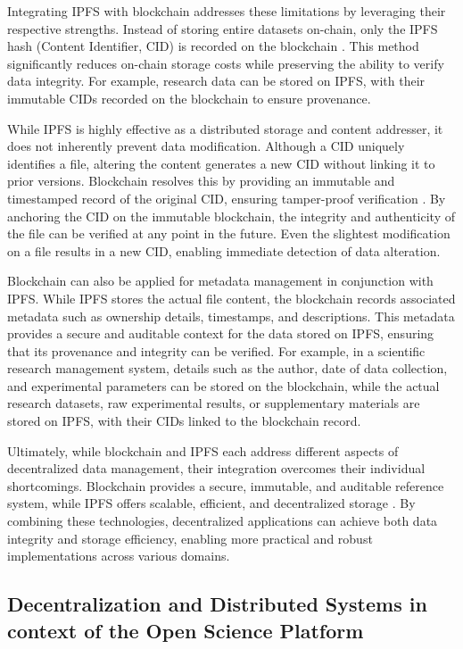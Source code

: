 \documentclass{article}
\begin{document}
Integrating IPFS with blockchain addresses these limitations by leveraging their respective strengths. Instead of storing entire datasets on-chain, only the IPFS hash (Content Identifier, CID) is recorded on the blockchain \cite{steichen2018}. This method significantly reduces on-chain storage costs while preserving the ability to verify data integrity. For example, research data can be stored on IPFS, with their immutable CIDs recorded on the blockchain to ensure provenance.

While IPFS is highly effective as a distributed storage and content addresser, it does not inherently prevent data modification\cite{benet2014ipfs}. Although a CID uniquely identifies a file, altering the content generates a new CID without linking it to prior versions. Blockchain resolves this by providing an immutable and timestamped record of the original CID, ensuring tamper-proof verification \cite{nakamoto2008bitcoin}. By anchoring the CID on the immutable blockchain, the integrity and authenticity of the file can be verified at any point in the future. Even the slightest modification on a file results in a new CID, enabling immediate detection of data alteration.

Blockchain can also be applied for metadata management in conjunction with IPFS. While IPFS stores the actual file content, the blockchain records associated metadata such as ownership details, timestamps, and descriptions. This metadata provides a secure and auditable context for the data stored on IPFS, ensuring that its provenance and integrity can be verified. For example, in a scientific research management system, details such as the author, date of data collection, and experimental parameters can be stored on the blockchain, while the actual research datasets, raw experimental results, or supplementary materials are stored on IPFS, with their CIDs linked to the blockchain record.

Ultimately, while blockchain and IPFS each address different aspects of decentralized data management, their integration overcomes their individual shortcomings. Blockchain provides a secure, immutable, and auditable reference system, while IPFS offers scalable, efficient, and decentralized storage \cite{nakamoto2008bitcoin, benet2014ipfs}. By combining these technologies, decentralized applications can achieve both data integrity and storage efficiency, enabling more practical and robust implementations across various domains.


\subsection{Decentralization and Distributed Systems in context of the Open Science Platform}
\end{document}
